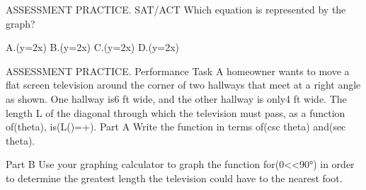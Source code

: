 \documentclass{article}
\newenvironment{practice}[2]{}{}        %
\newcommand{\answer}[1]{}               %
\newcommand{\placeholder}[2]{}          %
\begin{document}
\begin{practice}{24}{2}
ASSESSMENT PRACTICE. SAT/ACT Which equation is represented by the graph?
\placeholder{graph}{Red cot2x on arrowed x,y axes,O;xgridpi/10 labels-pi/2,pi/2;ygrid1 labels-4,-2,2,4;window-3pi/5..3pi/5,-5..5. Decreasing branches withzeros+-pi/4,asymptotes-pi/2,0,pi/2 notdrawn;end arrows.}
A.(y=2\cot x)
B.(y=\cot2x)
C.(y=2\tan x)
D.(y=\tan2x)
\answer{B}
\end{practice}
\begin{practice}{25}{3}
ASSESSMENT PRACTICE. Performance Task A homeowner wants to move a flat screen television around the corner of two hallways that meet at a right angle as shown. One hallway is6 ft wide, and the other hallway is only4 ft wide. The length L of the diagonal through which the television must pass, as a function of(theta), is(L(\theta)=+).
Part A Write the function in terms of(csc theta) and(sec theta).
\answer{Part A (L(\theta)=4\csc\theta+6\sec\theta)}
Part B Use your graphing calculator to graph the function for(0<\theta<90°) in order to determine the greatest length the television could have to the nearest foot.
\answer{Part B14 ft}
\placeholder{illustration}{Topview roomwithwoodfloor,bluecouch/chairs,table;L-shapedhall alongbottom andright. Bottomhall width4ft markedverticaldoublearrow,right hallwidth6ft markedhorizontal doublearrow. Blue thinTV diagonal frombottomlefttorightupper,justtouchinginnercorner. Dashedhorizontal/verticallegs andrightangles atouterwalls,angle theta atinnercornerbetweenleftwardhorizontal andTVtowardlowerleft.}
\end{practice}
\end{document}
